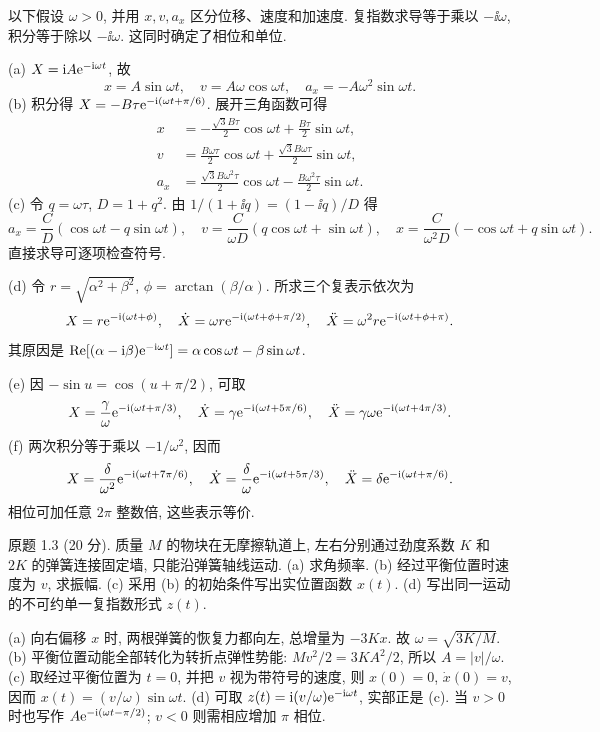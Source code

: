 \begin{solution}
以下假设 $\omega>0$, 并用 $x,v,a_x$ 区分位移、速度和加速度. 复指数求导等于乘以 $-\ii\omega$, 积分等于除以 $-\ii\omega$. 这同时确定了相位和单位.

(a) $X=\mathrm i A\mathrm e^{-\mathrm i\omega t}$, 故
\[
x=A\sin\omega t,\quad v=A\omega\cos\omega t,\quad a_x=-A\omega^2\sin\omega t.
\]
(b) 积分得 $X=-B\tau\mathrm e^{-\mathrm i(\omega t+\pi/6)}$. 展开三角函数可得
\begin{align*}
x&=-\frac{\sqrt3 B\tau}{2}\cos\omega t+\frac{B\tau}{2}\sin\omega t,\\
v&=\frac{B\omega\tau}{2}\cos\omega t+\frac{\sqrt3 B\omega\tau}{2}\sin\omega t,\\
a_x&=\frac{\sqrt3 B\omega^2\tau}{2}\cos\omega t-\frac{B\omega^2\tau}{2}\sin\omega t.
\end{align*}
(c) 令 $q=\omega\tau$, $D=1+q^2$. 由 $1/(1+\ii q)=(1-\ii q)/D$ 得
\[
a_x=\frac C D(\cos\omega t-q\sin\omega t),\quad
v=\frac C{\omega D}(q\cos\omega t+\sin\omega t),\quad
x=\frac C{\omega^2D}(-\cos\omega t+q\sin\omega t).
\]
直接求导可逐项检查符号.

(d) 令 $r=\sqrt{\alpha^2+\beta^2}$, $\phi=\arctan(\beta/\alpha)$. 所求三个复表示依次为
\[
X=r\mathrm e^{-\mathrm i(\omega t+\phi)},\quad
\dot X=\omega r\mathrm e^{-\mathrm i(\omega t+\phi+\pi/2)},\quad
\ddot X=\omega^2r\mathrm e^{-\mathrm i(\omega t+\phi+\pi)}.
\]
其原因是 $\operatorname{Re}[(\alpha-\mathrm i\beta)\mathrm e^{-\mathrm i\omega t}]=\alpha\cos\omega t-\beta\sin\omega t$.

(e) 因 $-\sin u=\cos(u+\pi/2)$, 可取
\[
X=\frac\gamma\omega\mathrm e^{-\mathrm i(\omega t+\pi/3)},\quad
\dot X=\gamma\mathrm e^{-\mathrm i(\omega t+5\pi/6)},\quad
\ddot X=\gamma\omega\mathrm e^{-\mathrm i(\omega t+4\pi/3)}.
\]
(f) 两次积分等于乘以 $-1/\omega^2$, 因而
\[
X=\frac\delta{\omega^2}\mathrm e^{-\mathrm i(\omega t+7\pi/6)},\quad
\dot X=\frac\delta\omega\mathrm e^{-\mathrm i(\omega t+5\pi/3)},\quad
\ddot X=\delta\mathrm e^{-\mathrm i(\omega t+\pi/6)}.
\]
相位可加任意 $2\pi$ 整数倍, 这些表示等价.
\end{solution}
\begin{exercise}\label{ps:1.3}
原题 1.3 (20 分). 质量 $M$ 的物块在无摩擦轨道上, 左右分别通过劲度系数 $K$ 和 $2K$ 的弹簧连接固定墙, 只能沿弹簧轴线运动. (a) 求角频率. (b) 经过平衡位置时速度为 $v$, 求振幅. (c) 采用 (b) 的初始条件写出实位置函数 $x(t)$. (d) 写出同一运动的不可约单一复指数形式 $z(t)$.
\end{exercise}
\begin{solution}
(a) 向右偏移 $x$ 时, 两根弹簧的恢复力都向左, 总增量为 $-3Kx$. 故 $\omega=\sqrt{3K/M}$. (b) 平衡位置动能全部转化为转折点弹性势能: $Mv^2/2=3KA^2/2$, 所以 $A=|v|/\omega$. (c) 取经过平衡位置为 $t=0$, 并把 $v$ 视为带符号的速度, 则 $x(0)=0$, $\dot x(0)=v$, 因而 $x(t)=(v/\omega)\sin\omega t$. (d) 可取 $z(t)=\mathrm i(v/\omega)\mathrm e^{-\mathrm i\omega t}$, 实部正是 (c). 当 $v>0$ 时也写作 $A\mathrm e^{-\mathrm i(\omega t-\pi/2)}$; $v<0$ 则需相应增加 $\pi$ 相位.
\end{solution}
